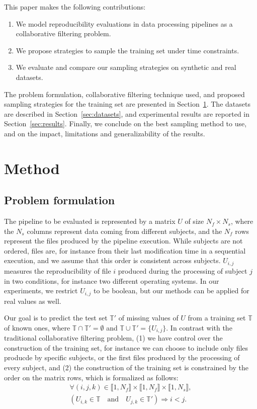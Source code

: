 \documentclass[10pt, conference, compsocconf]{IEEEtran}
\begin{document}
This paper makes the following contributions:
\begin{enumerate}
\item We model reproducibility evaluations in data processing pipelines as a collaborative filtering problem.
\item We propose strategies to sample the training set under time constraints.
\item We evaluate and compare our sampling strategies on synthetic and real datasets.
\end{enumerate}
The problem formulation, collaborative filtering technique used, and 
proposed sampling strategies for the training set are presented in 
Section~\ref{sec:methods}. The datasets are described in 
Section~\ref{sec:datasets}, and experimental results are reported in 
Section~\ref{sec:results}.
Finally, we conclude on the best sampling method to use, and on the 
impact, limitations and generalizability of the results.

\section{Method}
\label{sec:methods}
\subsection{Problem formulation}

The pipeline to be evaluated is represented by a matrix $U$ of size 
$N_f \times N_s$, where the $N_s$ columns represent data coming from 
different subjects, and the $N_f$ rows represent the files produced by 
the pipeline execution. While subjects are not ordered, files are, for 
instance from their last modification time in a sequential execution, 
and we assume that this order is consistent across subjects. $U_{i, j}$ 
measures the reproducibility of file $i$ produced during the processing 
of subject $j$ in two conditions, for instance two different 
operating systems. In our experiments, we restrict $U_{i,j}$ to be 
boolean, but our methods can be applied for real values as well. 

Our goal is to predict the test set $\mathbb{T'}$ of missing values of 
$U$ from a training set $\mathbb{T}$ of known ones, where $\mathbb{T} 
\cap \mathbb{T'} = \emptyset$ and $\mathbb{T} \cup \mathbb{T'} = 
\{U_{i,j}\}$. In contrast with the traditional collaborative filtering 
problem, (1) we have control over the construction of the training set, 
for instance we can choose to include only files producde by specific 
subjects, or the first files produced by the processing of every 
subject, and (2) the construction of the training set is constrained by 
the 
order on the matrix rows, which is formalized as follows: 
\begin{equation}
\begin{array}{l}
\forall (i, j, k) \in \llbracket 1, N_f \rrbracket \times \llbracket 1, N_f \rrbracket \times \llbracket 1, N_s \rrbracket, \\
 \left( U_{i,k} \in \mathbb{T} \quad \mathrm{and} \quad U_{j,k} \in \mathbb{T'} \right) \Rightarrow i < j. \label{eq:time}
 \end{array}
\end{equation}
\end{document}
